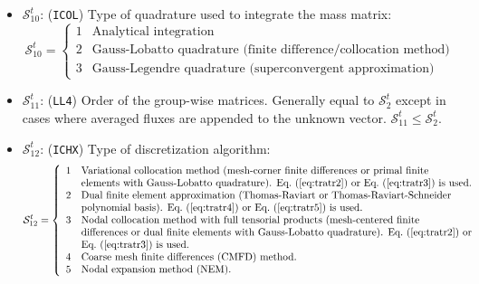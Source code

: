 \begin{itemize}
\item $\mathcal{S}^{t}_{10}$: ({\tt ICOL}) Type of quadrature used to integrate
the mass matrix:
\begin{displaymath}
\mathcal{S}^{t}_{10} = \left\{
\begin{array}{rl}
 1 & \textrm{Analytical integration} \\
 2 & \textrm{Gauss-Lobatto quadrature (finite difference/collocation method)} \\
 3 & \textrm{Gauss-Legendre quadrature (superconvergent approximation)}
\end{array} \right.
\end{displaymath}

\item $\mathcal{S}^{t}_{11}$: ({\tt LL4}) Order of the group-wise matrices.
Generally equal to
$\mathcal{S}^{t}_{2}$ except in cases where averaged fluxes are appended to the
unknown vector. $\mathcal{S}^{t}_{11}\le\mathcal{S}^{t}_{2}$.

\item $\mathcal{S}^{t}_{12}$: ({\tt ICHX}) Type of discretization algorithm:
\begin{displaymath}
\mathcal{S}^{t}_{12} = \left\{
\begin{array}{rl}
 1 & \textrm{Variational collocation method (mesh-corner finite differences or primal finite} \\
   & \textrm{elements with Gauss-Lobatto quadrature). \Eq{tratr2} or \Eq{tratr3} is used.} \\
 2 & \textrm{Dual finite element approximation (Thomas-Raviart or Thomas-Raviart-Schneider} \\
   & \textrm{polynomial basis). \Eq{tratr4} or \Eq{tratr5} is used.} \\
 3 & \textrm{Nodal collocation method with full tensorial products (mesh-centered finite} \\
   & \textrm{differences or dual finite elements with Gauss-Lobatto quadrature). \Eq{tratr2} or} \\
   & \textrm{\Eq{tratr3} is used.} \\
 4 & \textrm{Coarse mesh finite differences (CMFD) method.} \\
 5 & \textrm{Nodal expansion method (NEM).}
\end{array} \right.
\end{displaymath}


\end{itemize}
